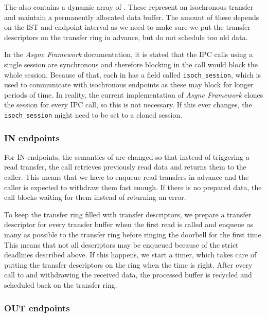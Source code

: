 The  also contains a dynamic array of
. These represent an isochronous transfer and
maintain a permanently allocated data buffer. The amount of these depends on
the IST and endpoint interval as we need to make sure we put the transfer
descriptors on the transfer ring in advance, but do not schedule too old data.

In the \textit{Async Framework} documentation, it is stated that the IPC calls
using a single session are synchronous and therefore blocking in the call would
block the whole session. Because of that, each  in
 has a field called \texttt{isoch_session}, which is used to
communicate with isochronous endpoints as these may block for longer periods of
time. In reality, the current implementation of \textit{Async Framework} clones
the session for every IPC call, so this is not necessary. If this ever changes,
the \texttt{isoch_session} might need to be set to a cloned session.

\subsubsection{IN endpoints}

For IN endpoints, the semantics of  are changed so that instead
of triggering a read transfer, the call retrieves previously read data and
returns them to the caller. This means that we have to enqueue read transfers
in advance and the caller is expected to withdraw them fast enough. If there is
no prepared data, the call blocks waiting for them instead of returning an
error.

To keep the transfer ring filled with transfer descriptors, we prepare a
transfer descriptor for every transfer buffer when the first read is called and
enqueue as many as possible to the transfer ring before ringing the doorbell
for the first time. This means that not all descriptors may be enqueued because
of the strict deadlines described above. If this happens, we start a timer,
which takes care of putting the transfer descriptors on the ring when the time
is right. After every call to  and withdrawing the received data,
the processed buffer is recycled and scheduled back on the transfer ring.

\subsubsection{OUT endpoints}

